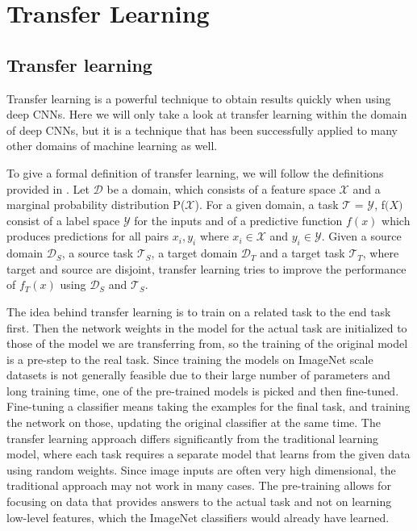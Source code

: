 \chapter{Transfer Learning}

\section{Transfer learning}
Transfer learning is a powerful technique to obtain results quickly when using deep CNNs. Here we will only take a look at transfer learning within the domain of deep CNNs, but it is a technique that has been successfully applied to many other domains of machine learning as well.

To give a formal definition of transfer learning, we will follow the definitions provided in \citep{transferSurvey2010}. Let $\mathcal{D}$ be a domain, which consists of a feature space $\mathcal{X}$ and a marginal probability distribution P($\mathcal{X}$). For a given domain, a task $\mathcal{T}$ = {$\mathcal{Y}$, f$\mathcal(X)$} consist of a label space $\mathcal{Y}$ for the inputs and of a predictive function $f(x)$ which produces predictions for all pairs ${x_i, y_i}$ where $x_i \in \mathcal{X}$ and $y_i \in \mathcal{Y}$. Given a source domain $\mathcal{D}_S$, a source task $\mathcal{T}_S$, a target domain $\mathcal{D}_T$ and a target task $\mathcal{T}_T$, where target and source are disjoint, transfer learning tries to improve the performance of $f_T(x)$ using $\mathcal{D}_S$ and $\mathcal{T}_S$.

The idea behind transfer learning is to train on a related task to the end task first. Then the network weights in the model for the actual task are initialized to those of the model we are transferring from, so the training of the original model is a pre-step to the real task. Since training the models on ImageNet \citep{imagenet} scale datasets is not generally feasible due to their large number of parameters and long training time, one of the pre-trained models is picked and then fine-tuned. Fine-tuning a classifier means taking the examples for the final task, and training the network on those, updating the original classifier at the same time. The transfer learning approach differs significantly from the traditional learning model, where each task requires a separate model that learns from the given data using random weights. Since image inputs are often very high dimensional, the traditional approach may not work in many cases. The pre-training allows for focusing on data that provides answers to the actual task and not on learning low-level features, which the ImageNet classifiers would already have learned.

